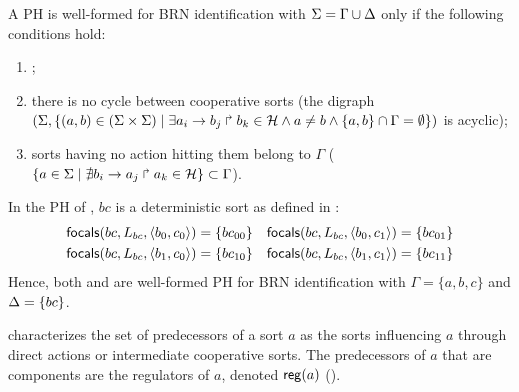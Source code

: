 \begin{property}\label{pro:wf-ph}
A PH is well-formed for BRN identification with
$\Sigma = \Gamma\cup\Delta$ only if the following conditions hold:
\begin{enumerate}
\item 
{};
\item 
there is no cycle between cooperative sorts
(the digraph $(\Sigma,\{(a,b)\in(\Sigma\times\Sigma)\mid \exists a_i\rightarrow b_j\Rsh b_k\in\mathcal{H}
\wedge a\neq b\wedge \{a,b\}\cap\Gamma=\emptyset \})$ is
acyclic);
\item 
sorts having no action hitting them belong to $\Gamma$
($\{ a \in \Sigma\mid \nexists b_i\rightarrow a_j\Rsh a_k\in\mathcal{H}\} \subset \Gamma$).
\end{enumerate}
\end{property}

\begin{example}
In the PH of , $bc$ is a deterministic sort as defined in
:
\begin{align*}
\mathsf{focals}(bc, L_{bc}, \langle b_0, c_0 \rangle) = \{bc_{00}\} &&
\mathsf{focals}(bc, L_{bc}, \langle b_0, c_1 \rangle) = \{bc_{01}\} \\
\mathsf{focals}(bc, L_{bc}, \langle b_1, c_0 \rangle) = \{bc_{10}\} && 
\mathsf{focals}(bc, L_{bc}, \langle b_1, c_1 \rangle) = \{bc_{11}\}
\end{align*}
Hence, both  and  are well-formed PH
for BRN identification with $\Gamma = \{a,b,c\}$ and $\Delta=\{bc\}$.
\end{example}

 characterizes the set of predecessors of a sort $a$ as the sorts influencing $a$
through direct actions or intermediate cooperative sorts.
The predecessors of $a$ that are components are the regulators of $a$, denoted $\mathsf{reg}({a})$
().

